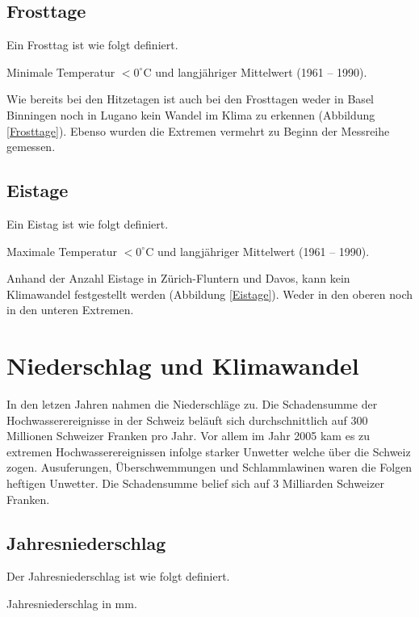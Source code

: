 \begin{refsection}
\subsection{Frosttage}
Ein Frosttag ist wie folgt definiert.

\begin{definition}
Minimale Temperatur $< 0^{\circ}$C und langjähriger Mittelwert (1961 -- 1990).
\end{definition}

Wie bereits bei den Hitzetagen ist auch bei den Frosttagen weder in Basel Binningen noch in Lugano kein Wandel im Klima zu erkennen (Abbildung \ref{Frosttage}). Ebenso wurden die Extremen vermehrt zu Beginn der Messreihe gemessen.


\subsection{Eistage}
Ein Eistag ist wie folgt definiert.

\begin{definition}
Maximale Temperatur $< 0^{\circ}$C und langjähriger Mittelwert (1961 -- 1990).
\end{definition}

Anhand der Anzahl Eistage in Zürich-Fluntern und Davos, kann kein Klimawandel festgestellt werden (Abbildung \ref{Eistage}). Weder in den oberen noch in den unteren Extremen. 


\section{Niederschlag und Klimawandel}
In den letzen Jahren nahmen die Niederschläge zu. Die Schadensumme der Hochwasserereignisse in der Schweiz beläuft sich durchschnittlich auf 300 Millionen Schweizer Franken pro Jahr. Vor allem im Jahr 2005 kam es zu extremen Hochwasserereignissen infolge starker Unwetter welche über die Schweiz zogen. Ausuferungen, Überschwemmungen und Schlammlawinen waren die Folgen heftigen Unwetter. Die Schadensumme belief sich auf 3 Milliarden Schweizer Franken. 


\subsection{Jahresniederschlag}
Der Jahresniederschlag ist wie folgt definiert.

\begin{definition}
Jahresniederschlag in mm.
\end{definition}


\end{refsection}
